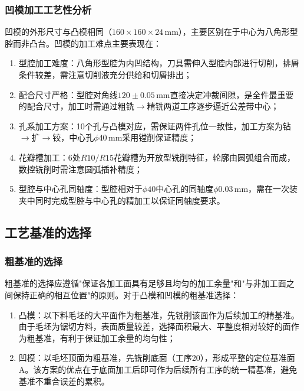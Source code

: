 \documentclass{xautCADreport}
\begin{document}
\subsubsection{凹模加工工艺性分析}

凹模的外形尺寸与凸模相同（$160\times160\times24\,\mathrm{mm}$），主要区别在于中心为八角形型腔而非凸台。凹模的加工难点主要表现在：

\begin{enumerate}
  \item 型腔加工难度：八角形型腔为内凹结构，刀具需伸入型腔内部进行切削，排屑条件较差，需注意切削液充分供给和切屑排出；
  \item 配合尺寸严格：型腔对角线$120\pm0.05\,\mathrm{mm}$直接决定冲裁间隙，是全件最重要的配合尺寸，加工时需通过粗铣$\to$精铣两道工序逐步逼近公差带中心；
  \item 孔系加工方案：10个孔与凸模对应，需保证两件孔位一致性，加工方案为钻$\to$扩$\to$铰，中心孔$\phi40\,\mathrm{mm}$采用镗削保证精度；
  \item 花瓣槽加工：6处$R10/R15$花瓣槽为开放型铣削特征，轮廓由圆弧组合而成，数控铣削时需注意圆弧插补精度；
  \item 型腔与中心孔同轴度：型腔相对于$\phi40$中心孔的同轴度$\phi0.03\,\mathrm{mm}$，需在一次装夹中同时完成型腔与中心孔的精加工以保证同轴度要求。
\end{enumerate}

\subsection{工艺基准的选择}

\subsubsection{粗基准的选择}

粗基准的选择应遵循"保证各加工面具有足够且均匀的加工余量"和"与非加工面之间保持正确的相互位置"的原则。对于凸模和凹模的粗基准选择：

\begin{enumerate}
  \item 凸模：以下料毛坯的大平面作为粗基准，先铣削该面作为后续加工的精基准。由于毛坯为锯切方料，表面质量较差，选择面积最大、平整度相对较好的面作为粗基准，有利于保证加工余量的均匀性；
  \item 凹模：以毛坯顶面为粗基准，先铣削底面（工序20），形成平整的定位基准面A。该方案的优点在于底面加工后即可作为后续所有工序的统一精基准，避免基准不重合误差的累积。
\end{enumerate}
\end{document}
